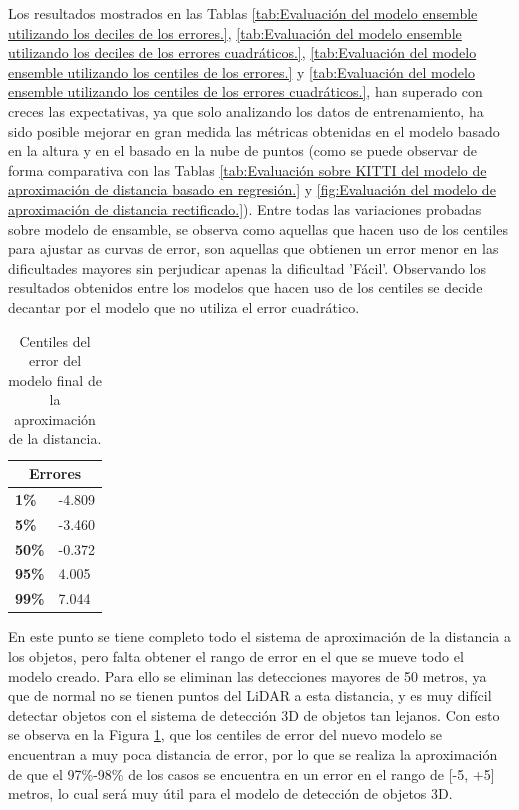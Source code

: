 Los resultados mostrados en las Tablas \ref{tab:Evaluación del modelo ensemble utilizando los deciles de los errores.}, \ref{tab:Evaluación del modelo ensemble utilizando los deciles de los errores cuadráticos.}, \ref{tab:Evaluación del modelo ensemble utilizando los centiles de los errores.} y \ref{tab:Evaluación del modelo ensemble utilizando los centiles de los errores cuadráticos.}, han superado con creces las expectativas, ya que solo analizando los datos de entrenamiento, ha sido posible mejorar en gran medida las métricas obtenidas en el modelo basado en la altura y en el basado en la nube de puntos (como se puede observar de forma comparativa con las Tablas \ref{tab:Evaluación sobre KITTI del modelo de aproximación de distancia basado en regresión.} y \ref{fig:Evaluación del modelo de aproximación de distancia rectificado.}). Entre todas las variaciones probadas sobre modelo de ensamble, se observa como aquellas que hacen uso de los centiles para ajustar as curvas de error, son aquellas que obtienen un error menor en las dificultades mayores sin perjudicar apenas la dificultad 'Fácil'. Observando los resultados obtenidos entre los modelos que hacen uso de los centiles se decide decantar por el modelo que no utiliza el error cuadrático.

\begin{table}[H]
\centering
\begin{tabular}{|ll|}
\hline
\multicolumn{2}{|c|}{\textbf{Errores}}       \\ \hline
\multicolumn{1}{|l|}{\textbf{1\%}}  & -4.809 \\ \hline
\multicolumn{1}{|l|}{\textbf{5\%}}  & -3.460 \\ \hline
\multicolumn{1}{|l|}{\textbf{50\%}} & -0.372 \\ \hline
\multicolumn{1}{|l|}{\textbf{95\%}} & 4.005  \\ \hline
\multicolumn{1}{|l|}{\textbf{99\%}} & 7.044  \\ \hline
\end{tabular}
\caption{Centiles del error del modelo final de la aproximación de la distancia.}
\label{tab:Centiles del modelo final de la aproximación de la distancia.}
\end{table}

En este punto se tiene completo todo el sistema de aproximación de la distancia a los objetos, pero falta obtener el rango de error en el que se mueve todo el modelo creado. Para ello se eliminan las detecciones mayores de 50 metros, ya que de normal no se tienen puntos del \ac{LiDAR} a esta distancia, y es muy difícil detectar objetos con el sistema de detección 3D de objetos tan lejanos. Con esto se observa en la Figura \ref{tab:Centiles del modelo final de la aproximación de la distancia.}, que los centiles de error del nuevo modelo se encuentran a muy poca distancia de error, por lo que se realiza la aproximación de que el 97\%-98\% de los casos se encuentra en un error en el rango de [-5, +5] metros, lo cual será muy útil para el modelo de detección de objetos 3D.

